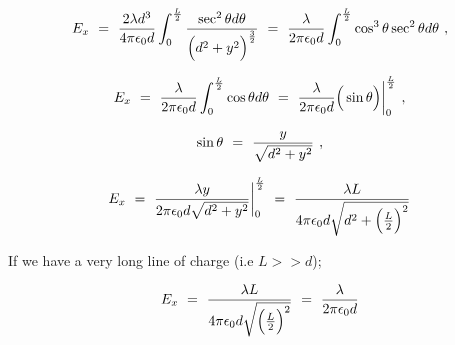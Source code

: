 \documentclass{article}
\begin{document}
\begin{equation} \label{eb-eq-35-1}
E_x \hspace{0.125cm} = \hspace{0.125cm} \frac{2\lambda d^{3}}{4\pi \epsilon_{0} d} \int_{0}^{\frac{L}{2}} \frac{\sec^{2}{\theta}d\theta{}}{ \Big( d^2 + y^2 \Big)^{\frac{3}{2}}}
\hspace{0.125cm} = \hspace{0.125cm} \frac{\lambda}{2\pi \epsilon_{0} d} \int_{0}^{\frac{L}{2}} \cos^{3}{\theta} \sec^{2}{\theta} d\theta \hspace{0.125cm} ,
\end{equation}

\begin{equation} \label{eb-eq-36-1}
E_x \hspace{0.125cm} = \hspace{0.125cm} \frac{\lambda}{2\pi \epsilon_{0} d} \int_{0}^{\frac{L}{2}} \cos{\theta} d\theta \hspace{0.125cm} = \hspace{0.125cm} \frac{\lambda}{2\pi \epsilon_{0} d} \Big( \sin{\theta} \Big) \bigg|_{0}^{\frac{L}{2}} \hspace{0.125cm} ,
\end{equation}

\begin{equation} \label{eb-eq-37-1}
\sin{\theta} \hspace{0.125cm} = \hspace{0.125cm} \frac{y}{\sqrt{d^2 + y^2}} \hspace{0.125cm} ,
\end{equation}

\begin{equation} \label{eb-eq-38-1}
E_{x} \hspace{0.125cm} = \hspace{0.125cm} \frac{\lambda y}{2\pi \epsilon_{0} d \sqrt{d^2 + y^2}} \bigg|_{0}^{\frac{L}{2}} \hspace{0.125cm} = \hspace{0.125cm} \frac{\lambda L}{4\pi \epsilon_{0} d \sqrt{d^2 + \Big(\frac{L}{2}\Big)^{2}}}
\end{equation}

If we have a very long line of charge (i.e \begin{math} L >> d \end{math});

\begin{equation} \label{eb-eq-39-1}
E_{x} \hspace{0.125cm} = \hspace{0.125cm} \frac{\lambda L}{4\pi \epsilon_{0} d \sqrt{\Big(\frac{L}{2}\Big)^{2}}} \hspace{0.125cm} = \hspace{0.125cm} \frac{\lambda}{2\pi \epsilon_{0} d}
\end{equation}
\end{document}
